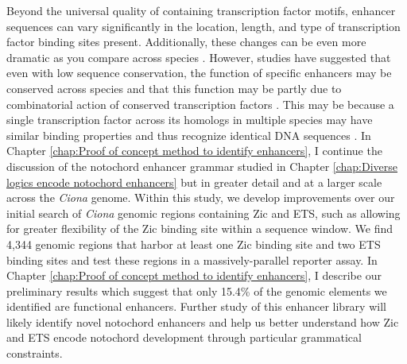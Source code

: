 \begin{dissertationintroduction}
    Beyond the universal quality of containing transcription factor motifs, enhancer sequences can vary significantly in the location, length, and type of transcription factor binding sites present. Additionally, these changes can be even more dramatic as you compare across species \cite{villar2015, ward2012, wong2020}. However, studies have suggested that even with low sequence conservation, the function of specific enhancers may be conserved across species and that this function may be partly due to combinatorial action of conserved transcription factors \cite{claussnitzer2014, wong2020}. This may be because a single transcription factor across its homologs in multiple species may have similar binding properties and thus recognize identical DNA sequences \cite{peter2011, wong2020}. In Chapter \ref{chap:Proof of concept method to identify enhancers}, I continue the discussion of the notochord enhancer grammar studied in Chapter \ref{chap:Diverse logics encode notochord enhancers} but in greater detail and at a larger scale across the \textit{Ciona} genome. Within this study, we develop improvements over our initial search of \textit{Ciona} genomic regions containing Zic and ETS, such as allowing for greater flexibility of the Zic binding site within a sequence window. We find 4,344 genomic regions that harbor at least one Zic binding site and two ETS binding sites and test these regions in a massively-parallel reporter assay. In Chapter \ref{chap:Proof of concept method to identify enhancers}, I describe our preliminary results which suggest that only 15.4\% of the genomic elements we identified are functional enhancers. Further study of this enhancer library will likely identify novel notochord enhancers and help us better understand how Zic and ETS encode notochord development through particular grammatical constraints. 
    

\end{dissertationintroduction}
